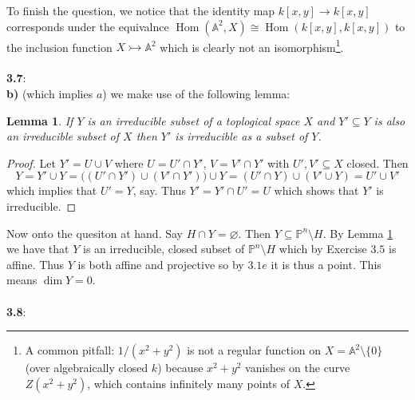 \documentclass[12pt]{article}
\numberwithin{thm}{subsection}
\numberwithin{defn}{subsection}
\newtheorem{lemma}{Lemma}
\numberwithin{lemma}{subsection}
\numberwithin{example}{subsection}
\numberwithin{notation}{subsection}
\numberwithin{cor}{subsection}
\numberwithin{remark}{subsection}
\numberwithin{condition}{subsection}
\numberwithin{question}{subsection}
\numberwithin{construction}{subsection}
\numberwithin{construction}{subsection}
\numberwithin{construction}{subsection}
\newcommand{\bb}[1]{\mathbb{#1}}
\newcommand{\lto}{\longrightarrow}
\begin{document}
%
To finish the question, we notice that the identity map $k[x,y] \lto k[x,y]$ corresponds under the equivalnce $\operatorname{Hom}(\bb{A}^2,X) \cong \operatorname{Hom}(k[x,y],k[x,y])$ to the inclusion function $X \rightarrowtail \bb{A}^2$ which is clearly not an isomorphism\footnote{
A common pitfall: $1/(x^2+y^2)$ is not a regular function on $X=\bb{A}^2\setminus\{0\}$
(over algebraically closed $k$) because $x^2+y^2$ vanishes on the curve $Z(x^2+y^2)$, which contains
infinitely many points of $X$.}.\\\\
%
\textbf{3.7}:\\
\textbf{b)} (which implies $a$) we make use of the following lemma:
\begin{lemma}
\label{lem:another_irred}
If $Y$ is an irreducible subset of a toplogical space $X$ and $Y' \subseteq Y$ is also an irreducible subset of $X$ then $Y'$ is irreducible as a subset of $Y$.
\end{lemma}
\begin{proof}
    Let $Y' = U \cup V$ where $U = U' \cap Y'$, $V = V' \cap Y'$ with $U',V' \subseteq X$ closed. Then
    \[Y = Y' \cup Y = \big( (U' \cap Y') \cup (V' \cap Y')\big) \cup Y = (U' \cap Y) \cup (V' \cup Y) = U' \cup V'\]
    which implies that $U'= Y$, say. Thus $Y' = Y' \cap U' = U$ which shows that $Y'$ is irreducible.
    \end{proof}
Now onto the quesiton at hand. Say $H \cap Y = \varnothing$. Then $Y \subseteq \bb{P}^n\setminus H$. By Lemma \ref{lem:another_irred} we have that $Y$ is an irreducible, closed subset of $\bb{P}^n\setminus H$ which by Exercise $3.5$ is affine. Thus $Y$ is both affine and projective so by $3.1e$ it is thus a point. This means $\operatorname{dim}Y = 0$.\\\\
%
\textbf{3.8}:\\
\end{document}
